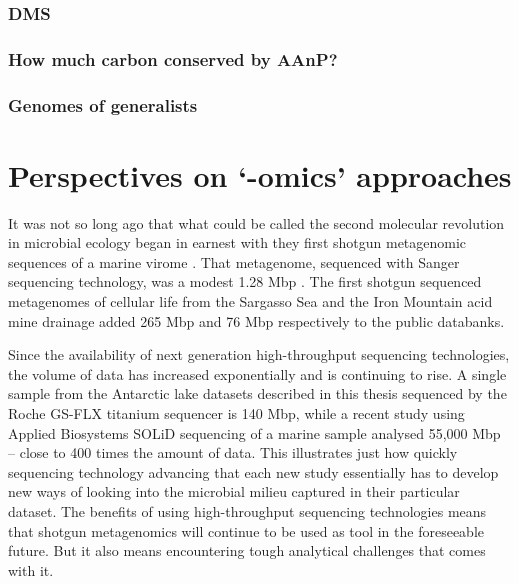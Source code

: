 \subsubsection{DMS}

\subsubsection{How much carbon conserved by AAnP?}

\subsubsection{Genomes of generalists}




\section{Perspectives on `-omics' approaches }
It was not so long ago that what could be called the second molecular revolution in microbial ecology began in earnest with they first shotgun metagenomic sequences of a marine virome \cite{Breitbart2002}.
That metagenome, sequenced with Sanger sequencing technology, was a modest 1.28 Mbp \cite{Breitbart2002}.
The first shotgun sequenced metagenomes of cellular life from the Sargasso Sea \cite{Venter2004} and the Iron Mountain acid mine drainage \cite{Tyson2004} added 265 Mbp and 76 Mbp respectively to the public databanks.

Since the availability of next generation high-throughput sequencing technologies, the volume of data has increased exponentially and is continuing to rise.
A single sample from the Antarctic lake datasets described in this thesis sequenced by the Roche GS-FLX titanium sequencer is 140 Mbp, while a recent study using Applied Biosystems SOLiD sequencing of a marine sample \cite{Iverson2012} analysed 55,000 Mbp -- close to 400 times the amount of data.
This illustrates just how quickly sequencing technology advancing that each new study essentially has to develop new ways of looking into the microbial milieu captured in their particular dataset.
The benefits of using high-throughput sequencing technologies means that shotgun metagenomics will continue to be used as tool in the foreseeable future.
But it also means encountering tough analytical challenges that comes with it.

